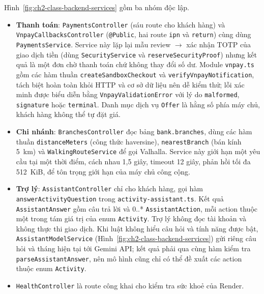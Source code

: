 Hình~\ref{fig:ch2-class-backend-services} gồm ba nhóm độc lập.
\begin{itemize}
  \item \textbf{Thanh toán}: \texttt{Payments\allowbreak{}Controller} (sáu route cho khách hàng) và \texttt{Vnpay\allowbreak{}Callbacks\allowbreak{}Controller} (\texttt{@Public}, hai route \texttt{ipn} và \texttt{return}) cùng dùng \texttt{Payments\allowbreak{}Service}. Service này lặp lại mẫu review $\rightarrow$ xác nhận TOTP của giao dịch tiền (dùng \texttt{Security\allowbreak{}Service} và \texttt{reserve\allowbreak{}Security\allowbreak{}Proof}) nhưng kết quả là một đơn chờ thanh toán chứ không thay đổi số dư. Module \texttt{vnpay.\allowbreak{}ts} gồm các hàm thuần \texttt{create\allowbreak{}Sandbox\allowbreak{}Checkout} và \texttt{verify\allowbreak{}Vnpay\allowbreak{}Notification}, tách biệt hoàn toàn khỏi HTTP và cơ sở dữ liệu nên dễ kiểm thử; lỗi xác minh được biểu diễn bằng \texttt{Vnpay\allowbreak{}Validation\allowbreak{}Error} với lý do \texttt{malformed}, \texttt{signature} hoặc \texttt{terminal}. Danh mục dịch vụ \texttt{Offer} là hằng số phía máy chủ, khách hàng không thể tự đặt giá.
  \item \textbf{Chi nhánh}: \texttt{Branches\allowbreak{}Controller} đọc bảng \texttt{bank.\allowbreak{}branches}, dùng các hàm thuần \texttt{distance\allowbreak{}Meters} (công thức haversine), \texttt{nearestBranch} (bán kính 5~km) và \texttt{Walking\allowbreak{}Route\allowbreak{}Service} để gọi Valhalla. Service này giới hạn một yêu cầu tại một thời điểm, cách nhau 1,5 giây, timeout 12 giây, phản hồi tối đa 512~KiB, để tôn trọng giới hạn của máy chủ công cộng.
  \item \textbf{Trợ lý}: \texttt{Assistant\allowbreak{}Controller} chỉ cho khách hàng, gọi hàm \texttt{answer\allowbreak{}Activity\allowbreak{}Question} trong \texttt{activity-\allowbreak{}assistant.\allowbreak{}ts}. Kết quả \texttt{Assistant\allowbreak{}Answer} gồm câu trả lời và 0..* \texttt{Assistant\allowbreak{}Action}, mỗi action thuộc một trong tám giá trị của enum \texttt{Activity}. Trợ lý không đọc tài khoản và không thực thi giao dịch. Khi luật không hiểu câu hỏi và tính năng được bật, \texttt{Assistant\allowbreak{}Model\allowbreak{}Service} (Hình~\ref{fig:ch2-class-backend-services}) gửi riêng câu hỏi và tháng hiện tại tới Gemini API; kết quả phải qua cùng hàm kiểm tra \texttt{parse\allowbreak{}Assistant\allowbreak{}Answer}, nên mô hình cũng chỉ có thể đề xuất các action thuộc enum \texttt{Activity}.
  \item \texttt{Health\allowbreak{}Controller} là route công khai cho kiểm tra sức khoẻ của Render.
\end{itemize}

